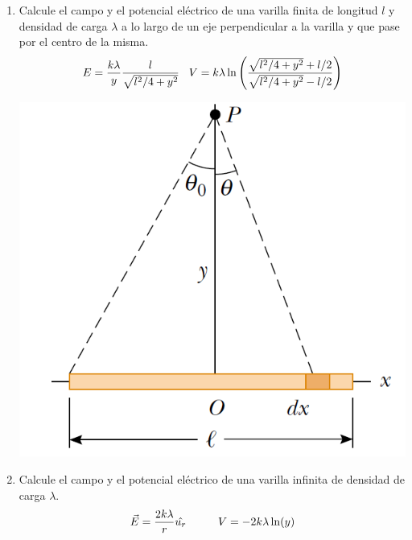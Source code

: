 \documentclass[11pt,twocolumn]{article}
\begin{document}
\begin{enumerate}
\item Calcule el campo y el potencial eléctrico de una varilla finita de longitud $l$ y densidad de carga $\lambda$ a lo largo de un eje perpendicular a la varilla y que pase por el centro de la misma.
\begin{displaymath}
E=\dfrac{k\lambda}{y}\dfrac{l}{\sqrt{l^2/4+y^2}} \hspace{0.3 cm} 
V=k\lambda \ln\left(\dfrac{\sqrt{l^2/4+y^2}+l/2}{\sqrt{l^2/4+y^2}-l/2}\right)
\end{displaymath}
{
\begin{center}
\includegraphics[scale=0.2]{varilla-finita}
\end{center}
}

\item Calcule el campo y el potencial eléctrico de una varilla infinita de densidad de carga $\lambda$.
\begin{displaymath}
\vec{E}=\dfrac{2k\lambda}{r}\hat{u_{r}} \hspace{1.0 cm} V=-2k\lambda \ln(y)
\end{displaymath}


\end{enumerate}
\end{document}
